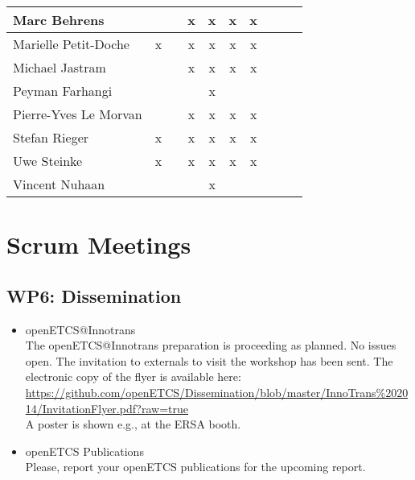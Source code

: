 \documentclass[a4paper, 11pt]{article}
\begin{document}
\begin{tabular}{|l|c|c|c||c|c|c||c|c|c|}
Marc Behrens         &   &   & x & x & x & x \\\hline
Marielle Petit-Doche & x &   & x & x & x & x \\\hline
Michael Jastram      &   &   & x & x & x & x \\\hline
Peyman Farhangi      &   &   &   & x &   &   \\\hline
Pierre-Yves Le Morvan&   &  & x & x & x & x \\\hline
Stefan Rieger        & x &   & x & x & x & x \\\hline
Uwe Steinke          & x &   & x & x & x & x \\\hline
Vincent Nuhaan       &   &   &   & x &   &   \\\hline
\end{tabular}


\section{Scrum Meetings}

\subsection{WP6: Dissemination}
\begin{itemize}
\item openETCS@Innotrans\\
The openETCS@Innotrans preparation is proceeding as planned. No issues open. The invitation to externals to visit the workshop has been sent. The electronic copy of the flyer is available here: \url{https://github.com/openETCS/Dissemination/blob/master/InnoTrans%202014/InvitationFlyer.pdf?raw=true}\\
A poster is shown e.g., at the ERSA booth.

\item openETCS Publications\\
Please, report your openETCS publications for the upcoming report.

\end{itemize}
\end{document}

